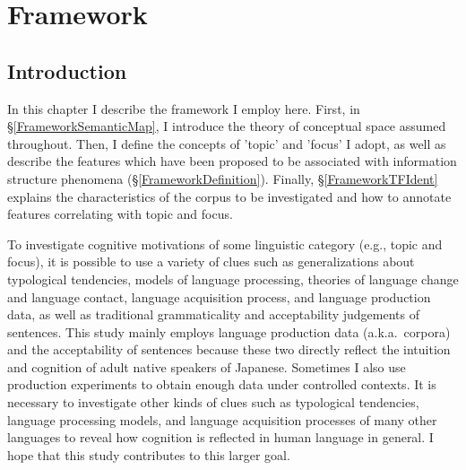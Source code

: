 \chapter{Framework}\label{Framework}


\section{Introduction}\label{FrameworkIntro}

In this chapter I describe the framework I employ here.
First, in \S \ref{FrameworkSemanticMap},
I introduce the theory of conceptual space assumed throughout.
Then, I define the concepts of 'topic' and 'focus' I adopt, as well as describe the features
which have been proposed to be associated with information structure phenomena (\S \ref{FrameworkDefinition}).
Finally,
\S \ref{FrameworkTFIdent} explains the characteristics of the corpus to be investigated and how to annotate features correlating with topic and focus.

To investigate cognitive motivations of some linguistic category (e.g., topic and focus),
it is possible to use a variety of clues such as generalizations about typological tendencies, models of language processing, theories of language change and language contact, language acquisition process, and language production data, as well as traditional grammaticality and acceptability judgements of sentences.
This study mainly employs language production data (a.k.a.\ corpora) and
the acceptability of sentences
because these two directly reflect the intuition and cognition of adult native speakers of Japanese.
Sometimes I also use production experiments to obtain enough data
under controlled contexts.
It is necessary to investigate other kinds of clues such as typological tendencies, language processing models, and language acquisition processes of many other languages
to reveal how cognition is reflected in human language in general.
I hope that this study contributes to this larger goal.

